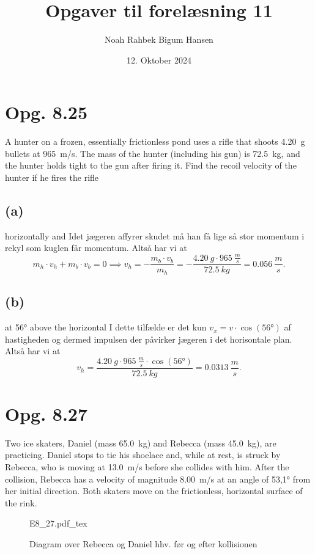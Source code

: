 \documentclass[12pt]{article}
\title{Opgaver til forelæsning 11}
\author{Noah Rahbek Bigum Hansen}
\date{12. Oktober 2024}
\newcommand{\incfig}[2][1]{%
  \def\svgwidth{#1\columnwidth}
  {#2.pdf_tex}
}
\begin{document}
\maketitle

\section*{Opg. 8.25}
A hunter on a frozen, essentially frictionless pond uses a rifle that shoots \qty{4,20}{g} bullets at \qty{965}{m/s}. The mass of the hunter (including his gun) is \qty{72,5}{kg}, and the hunter holds tight to the gun after firing it. Find the recoil velocity of the hunter if he fires the rifle

\subsection*{(a)}
horizontally and
\bigbreak
Idet jægeren affyrer skudet må han få lige så stor momentum i rekyl som kuglen får momentum. Altså har vi at
\[
m_h \cdot v_h + m_b \cdot v_b = 0 \implies v_h = - \frac{m_b\cdot v_b}{m_h} = - \frac{\qty{4,20}{g}\cdot \qty{965}{\frac{m}{s}}}{\qty{72,5}{kg}} = \qty{0,056}{\frac{m}{s}}
.\] 

\subsection*{(b)}
at \ang{56} above the horizontal
\bigbreak
I dette tilfælde er det kun $v_x = v\cdot \cos(\ang{56})$ af hastigheden og dermed impulsen der påvirker jægeren i det horisontale plan. Altså har vi at
\[
v_h = \frac{\qty{4,20}{g}\cdot \qty{965}{\frac{m}{s}}\cdot \cos(\ang{56})}{\qty{72,5}{kg}} = \qty{0,0313}{\frac{m}{s}}
.\] 

\section*{Opg. 8.27}
Two ice skaters, Daniel (mass \qty{65,0}{kg}) and Rebecca (mass \qty{45,0}{kg}), are practicing. Daniel stops to tie his shoelace and, while at rest, is struck by Rebecca, who is moving at \qty{13,0}{m/s} before she collides with him. After the collision, Rebecca has a velocity of magnitude \qty{8,00}{m/s} at an angle of \ang{53,1} from her initial direction. Both skaters move on the frictionless, horizontal surface of the rink.

\begin{figure}[ht]
  \centering
  \incfig[0.9]{E8_27}
  \caption{Diagram over Rebecca og Daniel hhv. før og efter kollisionen}
  \label{fig:E8_27}
\end{figure}
\end{document}
